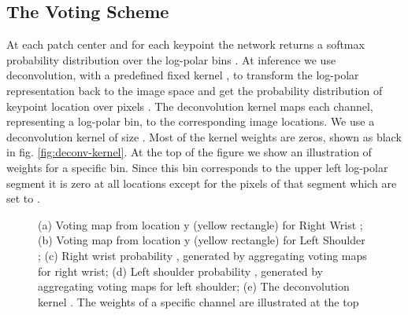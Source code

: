 \documentclass{article}
\begin{document}
	\subsection{The Voting Scheme}\label{sec:scheme-voting}
	At each patch center  and for each keypoint  the network returns a softmax probability distribution over the log-polar bins  . At inference we use deconvolution, with a predefined fixed kernel , to transform the log-polar representation  back to the image space and get the probability distribution of keypoint location over pixels . The deconvolution kernel maps each channel, representing a log-polar bin, to the corresponding image locations. We use a deconvolution kernel of size   . Most of the kernel weights are zeros, shown as black in fig. \ref{fig:deconv-kernel}. At the top of the figure we show an illustration of weights for a specific bin. Since this bin corresponds to the upper left log-polar segment it is zero at all locations except for the pixels of that segment which are set to .  
	
	
	\begin{figure}[ht]
		\centering
		\begin{minipage}{.65\textwidth}
			\quad
			
			\quad
		\end{minipage}
		\begin{minipage}{.3\textwidth}
		\end{minipage}
		\caption{(a) Voting map from location y (yellow rectangle) for Right Wrist ; (b) Voting map from location y (yellow rectangle) for Left Shoulder  ; (c) Right wrist probability , generated by aggregating voting maps for right wrist; (d) Left shoulder probability , generated by aggregating voting maps for left shoulder; (e) The deconvolution kernel . The weights of a specific channel are illustrated at the top}
		\label{fig:single-vote}
	\end{figure}
	
\end{document}
